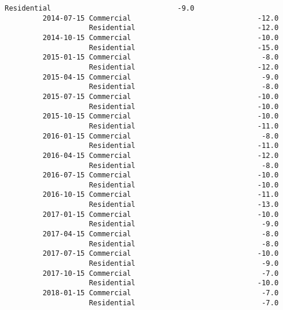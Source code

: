 \documentclass[11pt]{article}
\begin{document}
\begin{Verbatim}[commandchars=\\\{\}]
                    Residential                              -9.0   
         2014-07-15 Commercial                              -12.0   
                    Residential                             -12.0   
         2014-10-15 Commercial                              -10.0   
                    Residential                             -15.0   
         2015-01-15 Commercial                               -8.0   
                    Residential                             -12.0   
         2015-04-15 Commercial                               -9.0   
                    Residential                              -8.0   
         2015-07-15 Commercial                              -10.0   
                    Residential                             -10.0   
         2015-10-15 Commercial                              -10.0   
                    Residential                             -11.0   
         2016-01-15 Commercial                               -8.0   
                    Residential                             -11.0   
         2016-04-15 Commercial                              -12.0   
                    Residential                              -8.0   
         2016-07-15 Commercial                              -10.0   
                    Residential                             -10.0   
         2016-10-15 Commercial                              -11.0   
                    Residential                             -13.0   
         2017-01-15 Commercial                              -10.0   
                    Residential                              -9.0   
         2017-04-15 Commercial                               -8.0   
                    Residential                              -8.0   
         2017-07-15 Commercial                              -10.0   
                    Residential                              -9.0   
         2017-10-15 Commercial                               -7.0   
                    Residential                             -10.0   
         2018-01-15 Commercial                               -7.0   
                    Residential                              -7.0   
         

\end{Verbatim}
\end{document}
